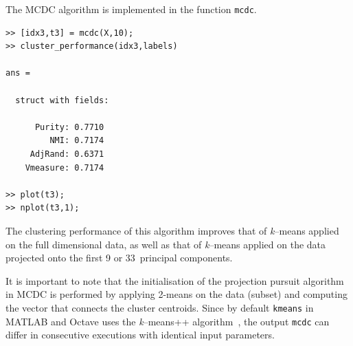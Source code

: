 \documentclass{book}
\begin{document}
The MCDC algorithm is implemented in the function {\tt mcdc}.

\begin{verbatim}
>> [idx3,t3] = mcdc(X,10);
>> cluster_performance(idx3,labels)

ans = 

  struct with fields:

      Purity: 0.7710
         NMI: 0.7174
     AdjRand: 0.6371
    Vmeasure: 0.7174

>> plot(t3);
>> nplot(t3,1);
\end{verbatim}

\noindent
%
The clustering performance of this algorithm improves that of {\it k}--means applied
on the full dimensional data, as well as that of {\it k}--means applied on
the data projected onto the first 9 or 33~principal components.

It is important to note
that the initialisation of the projection pursuit algorithm in MCDC is performed by
applying 2-means on the data (subset) and computing the vector that connects
the cluster centroids. Since by default {\tt kmeans} in MATLAB
and Octave uses the {\it k}--means++ algorithm~\cite{ArthurV2007}, 
the output {\tt mcdc} can differ in consecutive executions with
identical input parameters.
\end{document}
